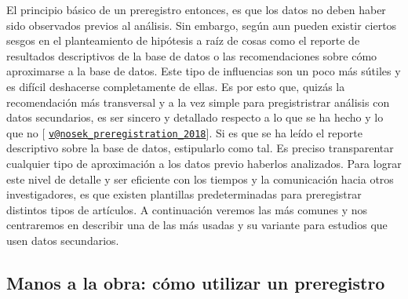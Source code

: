 \documentclass[
]{book}
\begin{document}
El principio básico de un preregistro entonces, es que los datos no deben haber sido observados previos al análisis. Sin embargo, según \citet{nosek_preregistration_2018} aun pueden existir ciertos sesgos en el planteamiento de hipótesis a raíz de cosas como el reporte de resultados descriptivos de la base de datos o las recomendaciones sobre cómo aproximarse a la base de datos. Este tipo de influencias son un poco más sútiles y es difícil deshacerse completamente de ellas. Es por esto que, quizás la recomendación más transversal y a la vez simple para pregistristrar análisis con datos secundarios, es ser sincero y detallado respecto a lo que se ha hecho y lo que no {[} \href{mailto:v@nosek_preregistration_2018}{\nolinkurl{v@nosek\_preregistration\_2018}}{]}. Si es que se ha leído el reporte descriptivo sobre la base de datos, estipularlo como tal. Es preciso transparentar cualquier tipo de aproximación a los datos previo haberlos analizados. Para lograr este nivel de detalle y ser eficiente con los tiempos y la comunicación hacia otros investigadores, es que existen plantillas predeterminadas para preregistrar distintos tipos de artículos. A continuación veremos las más comunes y nos centraremos en describir una de las más usadas y su variante para estudios que usen datos secundarios.

\hypertarget{manos-a-la-obra-cuxf3mo-utilizar-un-preregistro}{%
\subsection{Manos a la obra: cómo utilizar un preregistro}\label{manos-a-la-obra-cuxf3mo-utilizar-un-preregistro}}
\end{document}
